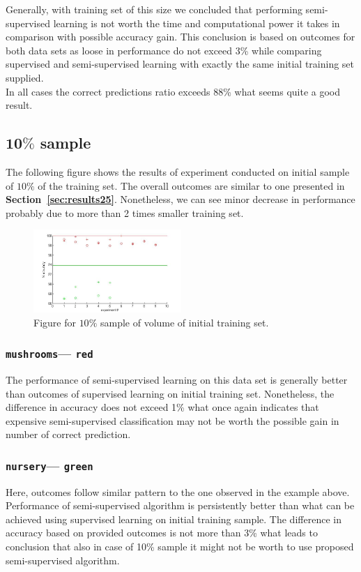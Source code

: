\documentclass[12pt, a4paper, pdflatex]{report}
\begin{document}
Generally, with training set of this size we concluded that performing semi-supervised learning is not worth the time and computational power it takes in comparison with possible accuracy gain. This conclusion is based on outcomes for both data sets as loose in performance do not exceed 3\% while comparing supervised and semi-supervised learning with exactly the same initial training set supplied.\\
In all cases the correct predictions ratio exceeds 88\% what seems quite a good result.

\subsection{$\mathbf{10\%}$ sample~\cite{results10}\label{sec:results10}}
The following figure shows the results of experiment conducted on initial sample of $10\%$ of the training set. The overall outcomes are similar to one presented in \textbf{Section~\ref{sec:results25}}. Nonetheless, we can see minor decrease in performance probably due to more than 2 times smaller training set.

\begin{figure}[htbp]
\centering
  \includegraphics[width=0.5\textwidth]{graphics/figures/Pfig2.jpg}
\begin{tiny}
\caption{\small Figure for $10\%$ sample of volume of initial training set.\label{img:10pc}}
\end{tiny}
\end{figure}

\subsubsection{\texttt{mushrooms}--- \texttt{red}}
The performance of semi-supervised learning on this data set is generally better than outcomes of supervised learning on initial training set. Nonetheless, the difference in accuracy does not exceed 1\% what once again indicates that expensive semi-supervised classification may not be worth the possible gain in number of correct prediction.

\subsubsection{\texttt{nursery}--- \texttt{green}}
Here, outcomes follow similar pattern to the one observed in the example above. Performance of semi-supervised algorithm is persistently better than what can be achieved using supervised learning on initial training sample. The difference in accuracy based on provided outcomes is not more than 3\% what leads to conclusion that also in case of 10\% sample it might not be worth to use proposed semi-supervised algorithm.
\end{document}
